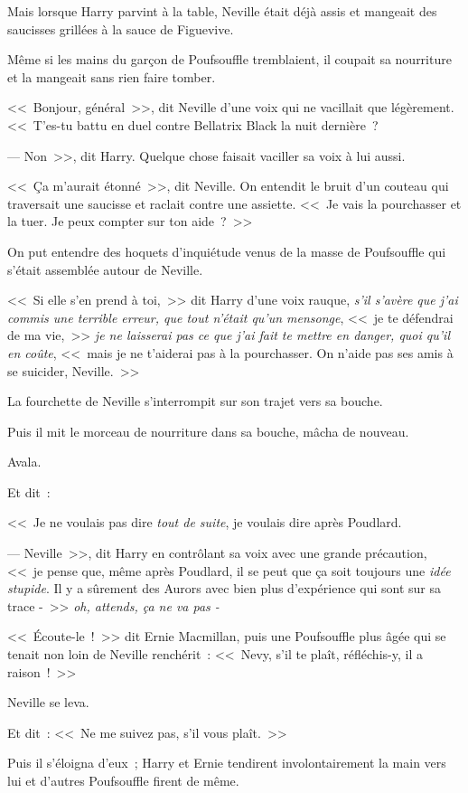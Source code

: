 Mais lorsque Harry parvint à la table, Neville était déjà assis et mangeait des saucisses grillées à la sauce de Figuevive.

Même si les mains du garçon de Poufsouffle tremblaient, il coupait sa nourriture et la mangeait sans rien faire tomber.

<<~Bonjour, général~>>, dit Neville d'une voix qui ne vacillait que légèrement. <<~T'es-tu battu en duel contre Bellatrix Black la nuit dernière~?

--- Non~>>, dit Harry. Quelque chose faisait vaciller sa voix à lui aussi.

<<~Ça m'aurait étonné~>>, dit Neville. On entendit le bruit d'un couteau qui traversait une saucisse et raclait contre une assiette. <<~Je vais la pourchasser et la tuer. Je peux compter sur ton aide~?~>>

On put entendre des hoquets d'inquiétude venus de la masse de Poufsouffle qui s'était assemblée autour de Neville.

<<~Si elle s'en prend à toi,~>> dit Harry d'une voix rauque, \emph{s'il s'avère que j'ai commis une terrible erreur, que tout n'était qu'un mensonge}, <<~je te défendrai de ma vie,~>> \emph{je ne laisserai pas ce que j'ai fait te mettre en danger, quoi qu'il en coûte}, <<~mais je ne t'aiderai pas à la pourchasser. On n'aide pas ses amis à se suicider, Neville.~>>

La fourchette de Neville s'interrompit sur son trajet vers sa bouche.

Puis il mit le morceau de nourriture dans sa bouche, mâcha de nouveau.

Avala.

Et dit~:

<<~Je ne voulais pas dire \emph{tout de suite}, je voulais dire après Poudlard.

--- Neville~>>, dit Harry en contrôlant sa voix avec une grande précaution, <<~je pense que, même après Poudlard, il se peut que ça soit toujours une \emph{idée stupide}. Il y a sûrement des Aurors avec bien plus d'expérience qui sont sur sa trace -~>> \emph{oh, attends, ça ne va pas -}

<<~Écoute-le~!~>> dit Ernie Macmillan, puis une Poufsouffle plus âgée qui se tenait non loin de Neville renchérit~: <<~Nevy, s'il te plaît, réfléchis-y, il a raison~!~>>

Neville se leva.

Et dit~: <<~Ne me suivez pas, s'il vous plaît.~>>

Puis il s'éloigna d'eux~; Harry et Ernie tendirent involontairement la main vers lui et d'autres Poufsouffle firent de même.

